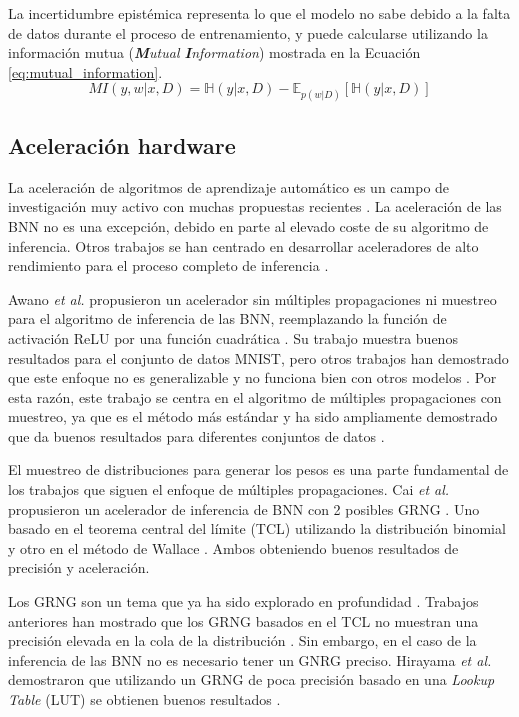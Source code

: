 La incertidumbre epistémica representa lo que el modelo no sabe debido a la falta de datos durante el proceso de entrenamiento, y puede calcularse utilizando la información mutua (\textit{\textbf{M}utual \textbf{I}nformation}) mostrada en la Ecuación \ref{eq:mutual_information}.
\begin{equation} \label{eq:mutual_information}
MI(y,w|x,D) = \mathbb{H}(y|x,D) - \mathbb{E}_{p(w|D)}[\mathbb{H}(y|x,D)]
\end{equation}

\subsection{Aceleración hardware}

La aceleración de algoritmos de aprendizaje automático es un campo de investigación muy activo con muchas propuestas recientes \cite{survey_ai22}. La aceleración de las BNN no es una excepción, debido en parte al elevado coste de su algoritmo de inferencia. Otros trabajos se han centrado en desarrollar aceleradores de alto rendimiento para el proceso completo de inferencia \cite{bnn_grng_accel, sampling_free_bnn_accel, bnn_clt_approx}.

Awano \emph{et al.} propusieron un acelerador sin múltiples propagaciones ni muestreo para el algoritmo de inferencia de las BNN, reemplazando la función de activación ReLU por una función cuadrática \cite{sampling_free_bnn_accel}. Su trabajo muestra buenos resultados para el conjunto de datos MNIST, pero otros trabajos han demostrado que este enfoque no es generalizable y no funciona bien con otros modelos \cite{bnn_clt_approx}. Por esta razón, este trabajo se centra en el algoritmo de múltiples propagaciones con muestreo, ya que es el método más estándar y ha sido ampliamente demostrado que da buenos resultados para diferentes conjuntos de datos \cite{bnn_grng_accel, bnn_clt_approx, bnn_hyper_uncertainty}.

El muestreo de distribuciones para generar los pesos es una parte fundamental de los trabajos que siguen el enfoque de múltiples propagaciones. Cai \emph{et al.} propusieron un acelerador de inferencia de BNN con 2 posibles GRNG \cite{bnn_grng_accel}. Uno basado en el teorema central del límite (TCL) utilizando la distribución binomial y otro en el método de Wallace \cite{wallace_grng}.  Ambos obteniendo buenos resultados de precisión y aceleración.

Los GRNG son un tema que ya ha sido explorado en profundidad \cite{grng_survey}. Trabajos anteriores han mostrado que los GRNG basados en el TCL no muestran una precisión elevada en la cola de la distribución \cite{clt_grng}. Sin embargo, en el caso de la inferencia de las BNN no es necesario tener un GNRG preciso. Hirayama \emph{et al.} demostraron que utilizando un GRNG de poca precisión basado en una \textit{Lookup Table} (LUT) se obtienen buenos resultados \cite{bnn_lut_grng}.

